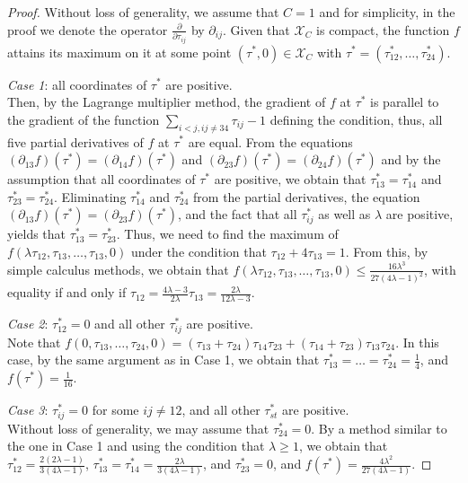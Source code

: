 \documentclass[twoside]{amsart}
\theoremstyle{definition}
\begin{document}
\begin{proof}
Without loss of generality, we assume that $C=1$ and for simplicity, in the proof we denote the operator $\frac{\partial}{\partial \tau_{ij}}$ by $\partial_{ij}$.
Given that $\mathcal{X}_C$ is compact, the function $f$ attains its maximum on it at some point $(\tau^*,0) \in \mathcal{X}_C$ with $\tau^*=(\tau^*_{12}, \ldots, \tau_{24}^*)$.

\emph{Case 1}: all coordinates of $\tau^*$ are positive.\\
Then, by the Lagrange multiplier method, the gradient of $f$ at $\tau^*$ is parallel to the gradient of the function $\sum_{i < j, ij \neq 34} \tau_{ij}-1$ defining the condition, thus, all five partial derivatives of $f$ at $\tau^*$ are equal. 
From the equations $(\partial_{13} f)(\tau^*) = (\partial_{14} f)(\tau^*)$ and $(\partial_{23} f)(\tau^*) = (\partial_{24} f)(\tau^*)$ and by the assumption that all coordinates of $\tau^*$ are positive, we obtain that $\tau_{13}^* = \tau_{14}^*$ and $\tau_{23}^* = \tau_{24}^*$. Eliminating $\tau_{14}^*$ and $\tau_{24}^*$ from the partial derivatives, the equation $(\partial_{13} f)(\tau^*) = (\partial_{23} f)(\tau^*)$, and the fact that all $\tau_{ij}^*$ as well as $\lambda$ are positive, yields that $\tau_{13}^*=\tau_{23}^*$. Thus, we need to find the maximum of $f(\lambda \tau_{12},\tau_{13},\ldots,\tau_{13},0)$ under the condition that $\tau_{12} + 4 \tau_{13} = 1$. From this, by simple calculus methods, we obtain that $f(\lambda \tau_{12},\tau_{13},\ldots,\tau_{13},0) \leq \frac{16 \lambda^3}{27(4\lambda - 1)^2}$, with equality if and only if $\tau_{12} = \frac{4 \lambda - 3}{2\lambda}\tau_{13} = \frac{2 \lambda}{12 \lambda - 3}$.

\emph{Case 2}: $\tau_{12}^* = 0$ and all other $\tau_{ij}^*$ are positive.\\
Note that $f(0,\tau_{13},\ldots,\tau_{24},0) = (\tau_{13}+\tau_{24})\tau_{14}\tau_{23}+(\tau_{14}+\tau_{23})\tau_{13}\tau_{24}$. In this case, by the same argument as in Case 1, we obtain that $\tau_{13}^*=\ldots=\tau_{24}^*=\frac{1}{4}$, and $f(\tau^*)=\frac{1}{16}$. 

\emph{Case 3}: $\tau_{ij}^* = 0$ for some $ij \neq 12$, and all other $\tau_{st}^*$ are positive.\\
Without loss of generality, we may assume that $\tau_{24}^* = 0$. By a method similar to the one in Case 1 and using the condition that $\lambda \geq 1$, we obtain that $\tau_{12}^* = \frac{2(2\lambda-1)}{3(4\lambda-1)}$, $\tau_{13}^* = \tau_{14}^* = \frac{2\lambda}{3(4\lambda-1)}$, and $\tau_{23}^* = 0$, and $f(\tau^*)=\frac{4\lambda^2}{27(4\lambda-1)}$.


\end{proof}
\end{document}
